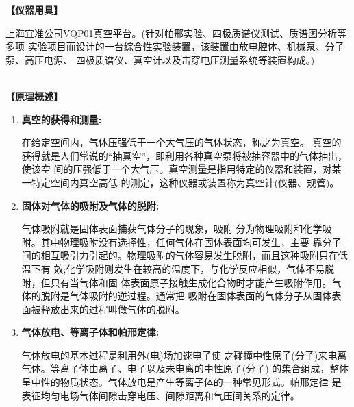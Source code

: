 \documentclass[11pt,a4paper]{ctexart}
\newcommand{\emptyline}{\par \ }
\begin{document}
\textbf{【仪器用具】}\par
上海宜准公司VQP01真空平台。(针对帕邢实验、四极质谱仪测试、质谱图分析等多项 实验项目而设计的一台综合性实验装置，该装置由放电腔体、机械泵、分子泵、高压电源、 四极质谱仪、真空计以及击穿电压测量系统等装置构成。)
\emptyline
\\
\textbf{【原理概述】}\par
\begin{enumerate}
\item \textbf{真空的获得和测量:}\par
在给定空间内，气体压强低于一个大气压的气体状态，称之为真空。 真空的获得就是人们常说的“抽真空”，即利用各种真空泵将被抽容器中的气体抽出，使该空 间的压强低于一个大气压。真空测量是指用特定的仪器和装置，对某一特定空间内真空高低 的测定，这种仪器或装置称为真空计(仪器、规管)。
\item \textbf{固体对气体的吸附及气体的脱附:}\par
气体吸附就是固体表面捕获气体分子的现象，吸附 分为物理吸附和化学吸附。其中物理吸附没有选择性，任何气体在固体表面均可发生，主要 靠分子间的相互吸引力引起的。物理吸附的气体容易发生脱附，而且这种吸附只在低温下有 效;化学吸附则发生在较高的温度下，与化学反应相似，气体不易脱附，但只有当气体和固 体表面原子接触生成化合物时才能产生吸附作用。气体的脱附是气体吸附的逆过程。通常把 吸附在固体表面的气体分子从固体表面被释放出来的过程叫做气体的脱附。

\item \textbf{气体放电、等离子体和帕邢定律:}\par
气体放电的基本过程是利用外(电)场加速电子使 之碰撞中性原子(分子)来电离气体。等离子体由离子、电子以及未电离的中性原子(分子) 的集合组成，整体呈中性的物质状态。气体放电是产生等离子体的一种常见形式。帕邢定律 是表征均匀电场气体间隙击穿电压、间隙距离和气压间关系的定律。


\end{enumerate}
\end{document}
